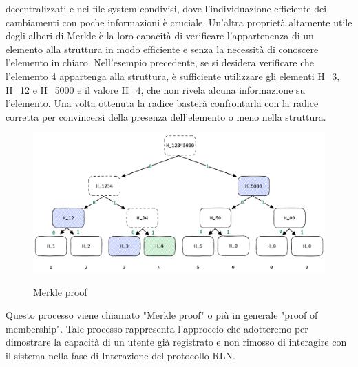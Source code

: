 decentralizzati e nei file system condivisi, dove l'individuazione efficiente dei cambiamenti con poche informazioni è
cruciale. Un'altra proprietà altamente utile degli alberi di Merkle è la loro capacità di verificare l'appartenenza di
un elemento alla struttura in modo efficiente e senza la necessità di conoscere l'elemento in chiaro. Nell'esempio
precedente, se si desidera verificare che l'elemento 4 appartenga alla struttura, è sufficiente utilizzare gli elementi
H\_3, H\_12 e H\_5000 e il valore H\_4, che non rivela alcuna informazione su l'elemento. Una volta ottenuta la radice
basterà confrontarla con la radice corretta per convincersi della presenza dell'elemento o meno nella struttura.
\begin{figure}[H]
    \centering
    \includegraphics[width=14cm]{./chapters/2.rln-protocol/images/2.merkle_proof.png}
    \label{fig:merkle_proof}
    \captionsetup{justification=centering}
    \caption{Merkle proof}
\end{figure}
Questo processo viene chiamato "Merkle proof" o più in generale "proof of membership". Tale processo rappresenta
l'approccio che adotteremo per dimostrare la capacità di un utente già registrato e non rimosso di interagire con il
sistema nella fase di Interazione del protocollo RLN.

